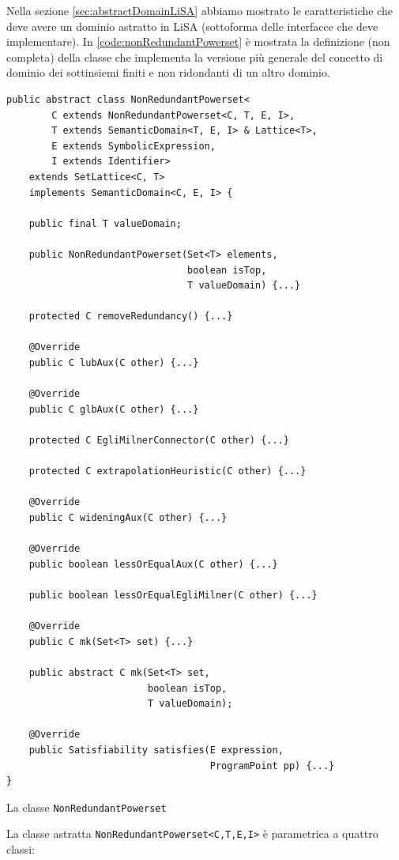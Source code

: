 Nella sezione \ref{sec:abstractDomainLiSA} abbiamo mostrato le caratteristiche che deve avere un dominio astratto in LiSA (sottoforma delle interfacce che deve implementare). In \ref{code:nonRedundantPowerset} è mostrata la definizione (non completa) della classe che implementa la versione più generale del concetto di dominio dei sottinsiemi finiti e non ridondanti di un altro dominio.
\begin{algorithm}
\begin{lstlisting}[belowskip=-1.3 \baselineskip]
public abstract class NonRedundantPowerset<
        C extends NonRedundantPowerset<C, T, E, I>,
        T extends SemanticDomain<T, E, I> & Lattice<T>,
        E extends SymbolicExpression,
        I extends Identifier> 
    extends SetLattice<C, T> 
    implements SemanticDomain<C, E, I> {

    public final T valueDomain;
	
    public NonRedundantPowerset(Set<T> elements, 
                                boolean isTop, 
                                T valueDomain) {...}
    
    protected C removeRedundancy() {...}
    
    @Override
    public C lubAux(C other) {...}
    
    @Override
    public C glbAux(C other) {...}
    
    protected C EgliMilnerConnector(C other) {...}
    
    protected C extrapolationHeuristic(C other) {...}
    
    @Override
    public C wideningAux(C other) {...}
    
    @Override
    public boolean lessOrEqualAux(C other) {...}
    
    public boolean lessOrEqualEgliMilner(C other) {...}
    
    @Override
    public C mk(Set<T> set) {...}
    
    public abstract C mk(Set<T> set, 
                         boolean isTop, 
                         T valueDomain);
    
    @Override
    public Satisfiability satisfies(E expression, 
                                    ProgramPoint pp) {...}
}
\end{lstlisting}
\caption{La classe \texttt{NonRedundantPowerset}}
\label{code:nonRedundantPowerset}
\end{algorithm}
La classe astratta \texttt{NonRedundantPowerset<C,T,E,I>} è parametrica a quattro classi:

